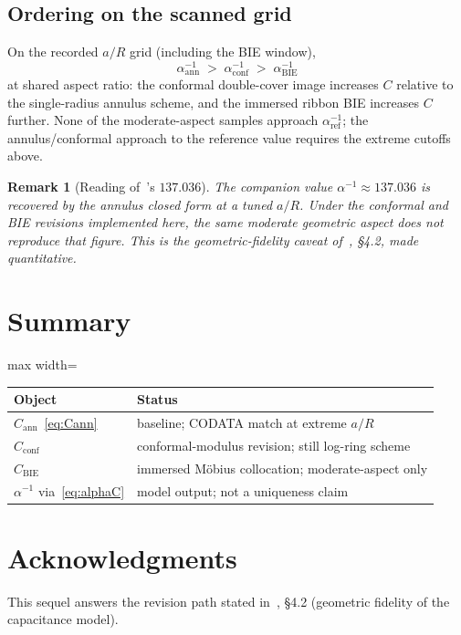 \documentclass[11pt,a4paper]{article}
\newtheorem{remark}{Remark}
\begin{document}
\subsection{Ordering on the scanned grid}

On the recorded $a/R$ grid (including the BIE window),
\begin{equation}
\alpha^{-1}_{\mathrm{ann}}
\;>\;
\alpha^{-1}_{\mathrm{conf}}
\;>\;
\alpha^{-1}_{\mathrm{BIE}}
\end{equation}
at shared aspect ratio: the conformal double-cover image increases $C$
relative to the single-radius annulus scheme, and the immersed ribbon
BIE increases $C$ further.  None of the moderate-aspect samples approach
$\alpha^{-1}_{\mathrm{ref}}$; the annulus/conformal approach to the
reference value requires the extreme cutoffs above.

\begin{remark}[Reading of~\cite{mobius2026}'s $137.036$]
The companion value $\alpha^{-1}\approx 137.036$ is recovered by the
annulus closed form at a tuned $a/R$.  Under the conformal and BIE
revisions implemented here, the same moderate geometric aspect does
\emph{not} reproduce that figure.  This is the geometric-fidelity
caveat of~\cite{mobius2026}, \S4.2, made quantitative.
\end{remark}

\section{Summary}

\begin{center}
\begin{adjustbox}{max width=\linewidth}\begin{tabular}{@{}lp{}@{}}
\toprule
Object & Status \\
\midrule
$C_{\mathrm{ann}}$~\eqref{eq:Cann} & baseline; CODATA match at extreme $a/R$ \\
$C_{\mathrm{conf}}$ & conformal-modulus revision; still log-ring scheme \\
$C_{\mathrm{BIE}}$ & immersed M\"obius collocation; moderate-aspect only \\
$\alpha^{-1}$ via~\eqref{eq:alphaC} & model output; not a uniqueness claim \\
\bottomrule
\end{tabular}\end{adjustbox}
\end{center}

\section*{Acknowledgments}
This sequel answers the revision path stated in~\cite{mobius2026},
\S4.2 (geometric fidelity of the capacitance model).
\end{document}
